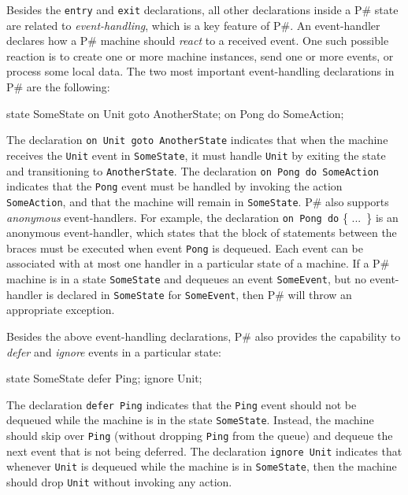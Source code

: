 \documentclass{llncs}
\newcommand{\ps}{P\#\xspace}
\begin{document}
Besides the \texttt{entry} and \texttt{exit} declarations, all other declarations inside a \ps state are related to \emph{event-handling}, which is a key feature of \ps. An event-handler declares how a \ps machine should \emph{react} to a received event. One such possible reaction is to create one or more machine instances, send one or more events, or process some local data. The two most important event-handling declarations in \ps are the following:

\begin{psharpNoLines}
state SomeState {
  on Unit goto AnotherState;
  on Pong do SomeAction;
}
\end{psharpNoLines}

\noindent
The declaration \texttt{on Unit goto AnotherState} indicates that when the machine receives the \texttt{Unit} event in \texttt{SomeState}, it must handle \texttt{Unit} by exiting the state and transitioning to \texttt{AnotherState}. The declaration \texttt{on Pong do SomeAction} indicates that the \texttt{Pong} event must be handled by invoking the action \texttt{SomeAction}, and that the machine will remain in \texttt{SomeState}. \ps also supports \emph{anonymous} event-handlers. For example, the declaration \texttt{on Pong do} \{ ...\ \} is an anonymous event-handler, which states that the block of statements between the braces must be executed when event \texttt{Pong} is dequeued. Each event can be associated with at most one handler in a particular state of a machine. If a \ps machine is in a state \texttt{SomeState} and dequeues an event \texttt{SomeEvent}, but no event-handler is declared in \texttt{SomeState} for \texttt{SomeEvent}, then \ps will throw an appropriate exception.

Besides the above event-handling declarations, \ps also provides the capability to \emph{defer} and \emph{ignore} events in a particular state:

\begin{psharpNoLines}
state SomeState {
  defer Ping;
  ignore Unit;
}
\end{psharpNoLines}

\noindent
The declaration \texttt{defer Ping} indicates that the \texttt{Ping} event should not be dequeued while the machine is in the state \texttt{SomeState}. Instead, the machine should skip over \texttt{Ping} (without dropping \texttt{Ping} from the queue) and dequeue the next event that is not being deferred. The declaration \texttt{ignore Unit} indicates that whenever \texttt{Unit} is dequeued while the machine is in \texttt{SomeState}, then the machine should drop \texttt{Unit} without invoking any action.
\end{document}

